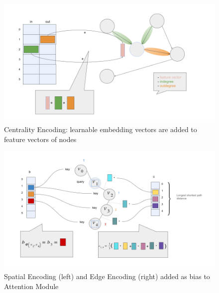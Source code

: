 \begin{figure}
    \centering
    \includegraphics[scale=0.4]{tex/res/graphormer_centr_enc.png}
    \caption{Centrality Encoding: learnable embedding vectors are added to feature vectors of nodes}
    \label{fig:graphormer_centr_enc}
\end{figure}

\begin{figure}
    \centering
    \includegraphics[scale=0.4]{tex/res/graphormer_attention.png}
    \caption{Spatial Encoding (left) and Edge Encoding (right) added as bias to Attention Module}
    \label{fig:graphormer_att}
\end{figure}


